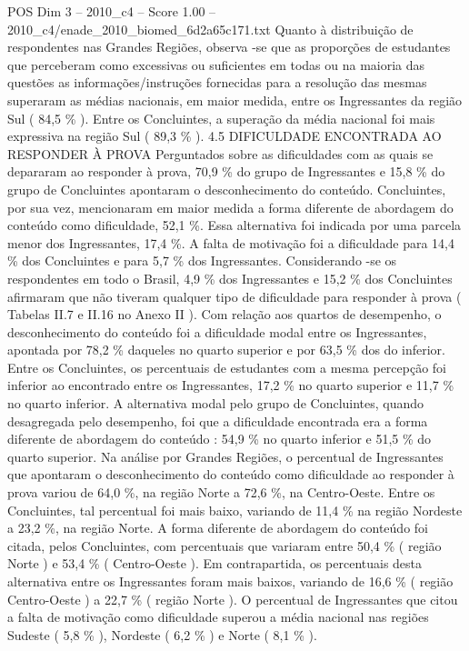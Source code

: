\begin{textsample}{POS Dim 3 – 2010\_c4 – Score 1.00 – 2010\_c4/enade\_2010\_biomed\_6d2a65c171.txt}
Quanto à distribuição de respondentes nas Grandes Regiões, observa -se que as proporções de estudantes que perceberam como excessivas ou suficientes em todas ou na maioria das questões as informações/instruções fornecidas para a resolução das mesmas superaram as médias nacionais, em maior medida, entre os Ingressantes da região Sul ( 84,5 \% ).
Entre os Concluintes, a superação da média nacional foi mais expressiva na região Sul ( 89,3 \% ). 4.5 DIFICULDADE ENCONTRADA AO RESPONDER À PROVA Perguntados sobre as dificuldades com as quais se depararam ao responder à prova, 70,9 \% do grupo de Ingressantes e 15,8 \% do grupo de Concluintes apontaram o desconhecimento do conteúdo.
Concluintes, por sua vez, mencionaram em maior medida a forma diferente de abordagem do conteúdo como dificuldade, 52,1 \%.
Essa alternativa foi indicada por uma parcela menor dos Ingressantes, 17,4 \%.
A falta de motivação foi a dificuldade para 14,4 \% dos Concluintes e para 5,7 \% dos Ingressantes.
Considerando -se os respondentes em todo o Brasil, 4,9 \% dos Ingressantes e 15,2 \% dos Concluintes afirmaram que não tiveram qualquer tipo de dificuldade para responder à prova ( Tabelas II.7 e II.16 no Anexo II ).
Com relação aos quartos de desempenho, o desconhecimento do conteúdo foi a dificuldade modal entre os Ingressantes, apontada por 78,2 \% daqueles no quarto superior e por 63,5 \% dos do inferior.
Entre os Concluintes, os percentuais de estudantes com a mesma percepção foi inferior ao encontrado entre os Ingressantes, 17,2 \% no quarto superior e 11,7 \% no quarto inferior.
A alternativa modal pelo grupo de Concluintes, quando desagregada pelo desempenho, foi que a dificuldade encontrada era a forma diferente de abordagem do conteúdo : 54,9 \% no quarto inferior e 51,5 \% do quarto superior.
Na análise por Grandes Regiões, o percentual de Ingressantes que apontaram o desconhecimento do conteúdo como dificuldade ao responder à prova variou de 64,0 \%, na região Norte a 72,6 \%, na Centro-Oeste.
Entre os Concluintes, tal percentual foi mais baixo, variando de 11,4 \% na região Nordeste a 23,2 \%, na região Norte.
A forma diferente de abordagem do conteúdo foi citada, pelos Concluintes, com percentuais que variaram entre 50,4 \% ( região Norte ) e 53,4 \% ( Centro-Oeste ).
Em contrapartida, os percentuais desta alternativa entre os Ingressantes foram mais baixos, variando de 16,6 \% ( região Centro-Oeste ) a 22,7 \% ( região Norte ).
O percentual de Ingressantes que citou a falta de motivação como dificuldade superou a média nacional nas regiões Sudeste ( 5,8 \% ), Nordeste ( 6,2 \% ) e Norte ( 8,1 \% ).

\end{textsample}
